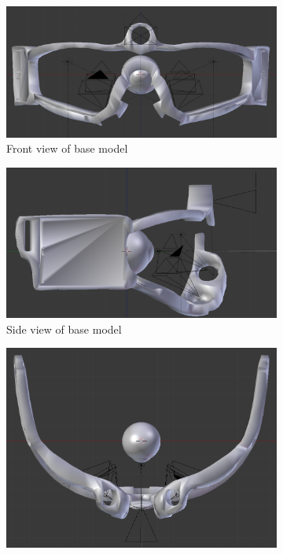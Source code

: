 \begin{figure}
	\begin{subfigure}{.5\textwidth}
		\centering
		\includegraphics[width=0.9\linewidth]{images/base_model_front.png}
		\caption{Front view of base model}
		\label{fig:baseFront}
	\end{subfigure}
	\begin{subfigure}{.5\textwidth}
		\centering
		\includegraphics[width=0.787\linewidth]{images/base_model_side.png}
		\caption{Side view of base model}
		\label{fig:baseSide}
	\end{subfigure}
	\begin{subfigure}{.5\textwidth}
		\centering
		\includegraphics[width=0.9\linewidth]{images/base_model_bottom.png}

\end{subfigure}
\end{figure}
